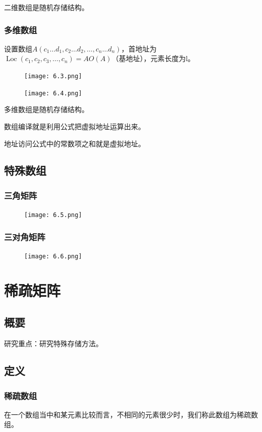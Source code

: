 \documentclass[AutoFakeBold]{LZUThesis2007}
\begin{document}
二维数组是随机存储结构。
			\subsubsection{多维数组}
设置数组$A\left(c_{1} \ldots d_{1}, c_{2} \ldots d_{2}, \ldots, c_{n} \ldots d_{n}\right)$，首地址为$\operatorname{Loc}\left(c_{1}, c_{2}, c_{3}, \dots, c_{n}\right)=A O(A)$（基地址），元素长度为l。
\begin{figure}[H]
    \centering
    \texttt{[image: 6.3.png]}
    \label{fig_install_texlive}
\end{figure}
\begin{figure}[H]
    \centering
    \texttt{[image: 6.4.png]}
    \label{fig_install_texlive}
\end{figure}
			多维数组是随机存储结构。

			数组编译就是利用公式把虚拟地址运算出来。

地址访问公式中的常数项之和就是虚拟地址。
		\subsection{特殊数组}
			\subsubsection{三角矩阵}
\begin{figure}[H]
    \centering
    \texttt{[image: 6.5.png]}
    \label{fig_install_texlive}
\end{figure}
			\subsubsection{三对角矩阵}
\begin{figure}[H]
    \centering
    \texttt{[image: 6.6.png]}
    \label{fig_install_texlive}
\end{figure}


	\section{稀疏矩阵}
		\subsection{概要}
研究重点：研究特殊存储方法。
		\subsection{定义}
			\subsubsection{稀疏数组}
在一个数组当中和某元素比较而言，不相同的元素很少时，我们称此数组为稀疏数组。
		
\end{document}
